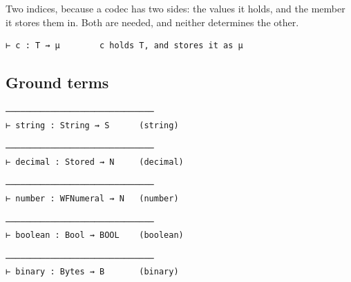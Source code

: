 Two indices, because a codec has two sides: the values it holds, and the member it stores them in.
Both are needed, and neither determines the other.

\begin{verbatim}
⊢ c : T ⇝ μ        c holds T, and stores it as μ
\end{verbatim}

\subsection{Ground terms}\label{ground-terms}

\begin{definition}[(string)]
\label{rule:string}
\leanok
\begin{verbatim}
──────────────────────────────
⊢ string : String ⇝ S      (string)
\end{verbatim}
\end{definition}

\begin{definition}[(decimal)]
\label{rule:decimal}
\leanok
\begin{verbatim}
──────────────────────────────
⊢ decimal : Stored ⇝ N     (decimal)
\end{verbatim}
\end{definition}

\begin{definition}[(number)]
\label{rule:number}
\leanok
\begin{verbatim}
──────────────────────────────
⊢ number : WFNumeral ⇝ N   (number)
\end{verbatim}
\end{definition}

\begin{definition}[(boolean)]
\label{rule:boolean}
\leanok
\begin{verbatim}
──────────────────────────────
⊢ boolean : Bool ⇝ BOOL    (boolean)
\end{verbatim}
\end{definition}

\begin{definition}[(binary)]
\label{rule:binary}
\leanok
\begin{verbatim}
──────────────────────────────
⊢ binary : Bytes ⇝ B       (binary)
\end{verbatim}
\end{definition}


